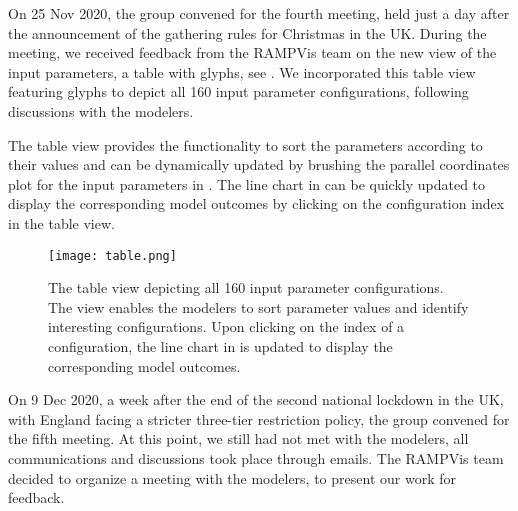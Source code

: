 On 25 Nov 2020, the group convened for the fourth meeting, held just a day after the announcement of the gathering rules for Christmas in the UK.
During the meeting, we received feedback from the RAMPVis team on the new view of the input parameters, a table with glyphs, see . We incorporated this table view featuring glyphs to depict all 160 input parameter configurations, following discussions with the modelers.

The table view provides the functionality to sort the parameters according to their values and can be dynamically updated by brushing the parallel coordinates plot for the input parameters in . The line chart in  can be quickly updated to display the corresponding model outcomes by clicking on the configuration index in the table view.

\begin{figure}[tb!]
    \centering
    \texttt{[image: table.png]}
    \caption{The table view depicting all 160 input parameter configurations.
    The view enables the modelers to sort parameter values and identify interesting configurations.
    Upon clicking on the index of a configuration, the line chart in  is updated to display the corresponding model outcomes.
    }
    \label{fig:table-view}

\end{figure}


On 9 Dec 2020, a week after the end of the second national lockdown in the UK, with England facing a stricter three-tier restriction policy, the group convened for the fifth meeting.
At this point, we still had not met with the modelers, all communications and discussions took place through emails.
The RAMPVis team decided to organize a meeting with the modelers, to present our work for feedback.


